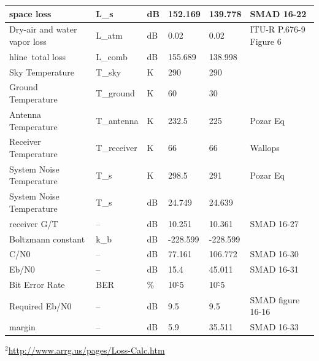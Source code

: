 \documentclass[12pt]{article}
\begin{document}
\begin{center}
\begin{longtable}{| p{3.9cm} | p{1.6cm} | p{1.4cm} | p{1.4cm} | p{1.4cm} | p{5cm} |}
    space loss & L\_s  & dB    & 152.169 & 139.778 & SMAD 16-22 \\\hline
    Dry-air and water vapor loss & L\_atm & dB    & 0.02  & 0.02  & ITU-R P.676-9 Figure 6 \\hline\
    total loss & L\_comb & dB    & 155.689 & 138.998 &  \\\hline
    Sky Temperature & T\_sky & K     & 290   & 290   &  \\\hline
    Ground Temperature & T\_ground & K     & 60    & 30    &  \\\hline
    Antenna Temperature & T\_antenna & K     & 232.5 & 225   & Pozar Eq \\\hline
    Receiver Temperature & T\_receiver & K     & 66    & 66    & Wallops \\\hline
    System Noise Temperature & T\_s  & K     & 298.5 & 291   & Pozar Eq \\\hline
    System Noise Temperature & T\_s  & dB    & 24.749 & 24.639 &  \\\hline
    receiver G/T & --    & dB    & 10.251 & 10.361 & SMAD 16-27 \\\hline
    Boltzmann constant & k\_b  & dB    & -228.599 & -228.599 &  \\\hline
    C/N0  & --    & dB    & 77.161 & 106.772 & SMAD 16-30 \\\hline
    Eb/N0 & --    & dB    & 15.4  & 45.011 & SMAD 16-31 \\\hline
    Bit Error Rate & BER   & \%    & 10\^-5 & 10\^-5 &  \\\hline
    Required Eb/N0 & --    & dB    & 9.5   & 9.5   & SMAD figure 16-16 \\\hline
    margin & --    & dB    & 5.9   & 35.511 & SMAD 16-33 \\
\hline
\end{longtable}
\end{center}
$^2$\url{http://www.arrg.us/pages/Loss-Calc.htm}

\noindent
\newline
\newpage
\end{document}
